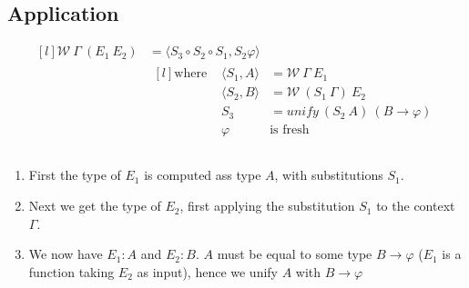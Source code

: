 \subsection{Application}

\[\begin{matrix*}[l]
    \mathcal{W} \ \Gamma \ (E_1 \ E_2) & = \langle S_3 \circ S_2 \circ S_1, S_2 \varphi \rangle \\
    & \begin{matrix*}[l]
        \text{where } & \langle S_1, A \rangle & = \mathcal{W} \ \Gamma \ E_1 \\
        & \langle S_2, B \rangle & = \mathcal{W} \ (S_1 \ \Gamma) \ E_2 \\
        & S_3 & = unify \ (S_2 \ A) \ (B \to \varphi) \\
        & \varphi & \text{is fresh} \\
    \end{matrix*} \\
\end{matrix*}\]
\begin{enumerate}
    \item First the type of $E_1$ is computed ass type $A$, with substitutions $S_1$.
    \item Next we get the type of $E_2$, first applying the substitution $S_1$ to the context $\Gamma$.
    \item We now have $E_1 : A$ and $E_2 : B$. $A$ must be equal to some type $B \to \varphi$ ($E_1$ is a function taking $E_2$ as input), hence we unify $A$ with $B \to \varphi$
\end{enumerate}


